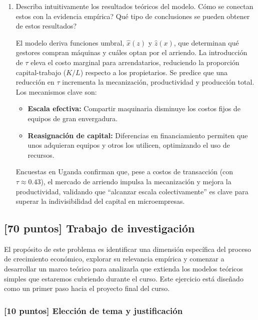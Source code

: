 \documentclass{article}
\theoremstyle{remark}
\theoremstyle{definition}
\begin{document}
\begin{enumerate}[label= (\roman*)]
\begin{tcolorbox}
        
    \end{tcolorbox}

\item Describa intuitivamente los resultados te\'oricos del modelo. C\'omo se conectan estos con la evidencia emp\'irica? Qu\'e tipo de conclusiones se pueden obtener de estos resultados?

     \begin{tcolorbox}
        El modelo deriva funciones umbral, $\hat{x}(z)$ y $\hat{z}(x)$, que determinan qué gestores compran máquinas y cuáles optan por el arriendo. La introducción de $\tau$ eleva el costo marginal para arrendatarios, reduciendo la proporción capital-trabajo ($K/L$) respecto a los propietarios. Se predice que una reducción en $\tau$ incrementa la mecanización, productividad y producción total. Los mecanismos clave son:
        \begin{itemize}
            \item \textbf{Escala efectiva:} Compartir maquinaria disminuye los costos fijos de equipos de gran envergadura.
            \item \textbf{Reasignación de capital:} Diferencias en financiamiento permiten que unos adquieran equipos y otros los utilicen, optimizando el uso de recursos.
        \end{itemize}
        Encuestas en Uganda confirman que, pese a costos de transacción (con $\tau \approx 0.43$), el mercado de arriendo impulsa la mecanización y mejora la productividad, validando que “alcanzar escala colectivamente” es clave para superar la indivisibilidad del capital en microempresas.

    \end{tcolorbox}

\end{enumerate}

\subsection{[70 puntos] Trabajo de investigaci\'on}

El propósito de este problema es identificar una dimensión específica del proceso de crecimiento económico, explorar su relevancia empírica y comenzar a desarrollar un marco teórico para analizarla que extienda los modelos teóricos simples que estaremos cubriendo durante el curso. Este ejercicio está diseñado como un primer paso hacia el proyecto final del curso.

\subsubsection{[10 puntos] Elección de tema y justificación}
\end{document}

